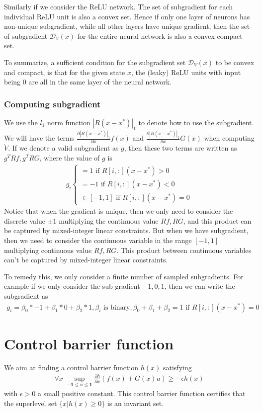 \documentclass{article}
\begin{document}
Similarly if we consider the ReLU network. The set of subgradient for each individual ReLU unit is also a convex set. Hence if only one layer of neurons has non-unique subgradient, while all other layers have unique gradient, then the set of subgradient $\mathcal{D}_V(x)$ for the entire neural network is also a convex compact set.

To summarize, a sufficient condition for the subgradient set $\mathcal{D}_V(x)$ to be convex and compact, is that for the given state $x$, the (leaky) ReLU units with input being 0 are all in the same layer of the neural network.

\subsubsection{Computing subgradient}
We use the $l_1$ norm function $|R(x-x^*)|_1$ to denote how to use the subgradient. We will have the terms $\frac{\partial |R(x-x^*)|_1}{\partial x}f(x)$ and $\frac{\partial |R(x-x^*)|_1}{\partial x}G(x)$ when computing $\dot{V}$. If we denote a valid subgradient as $g$, then these two terms are written as $g^TRf, g^TRG$, where the value of $g$ is
\begin{align}
	g_i  \begin{cases}
		=1 \text{ if } R[i, :](x-x^*) > 0\\
		=-1 \text{ if } R[i, :](x-x^*) < 0\\
		\in[-1, 1] \text{ if } R[i, :](x-x^*)=0
	\end{cases}
\end{align}
Notice that when the gradient is unique, then we only need to consider the discrete value $\pm1$ multiplying the continuous value $Rf, RG$, and this product can be captured by mixed-integer linear constraints. But when we have subgradient, then we need to consider the continuous variable in the range $[-1, 1]$ multiplying continuous value $Rf, RG$. This product between continuous variables can't be captured by mixed-integer linear constraints.

To remedy this, we only consider a finite number of sampled subgradients. For example if we only consider the sub-gradient $-1, 0, 1$, then we can write the subgradient as
\begin{align}
	g_i = \beta_0*-1+\beta_1 * 0 + \beta_2 * 1, \beta_i \text{ is binary}, \beta_0 + \beta_1 + \beta_2 = 1 \text{ if } R[i, :] (x-x^*)=0
\end{align}

\section{Control barrier function}
We aim at finding a control barrier function $h(x)$ satisfying
\begin{align}
	\forall x\;\sup_{-\mathbf{1}\le u\le\mathbf{1}} \frac{\partial h}{\partial x}(f(x) + G(x)u) \ge -\epsilon h(x)
\end{align}
with $\epsilon > 0$ a small positive constant. This control barrier function certifies that the superlevel set $\{x | h(x) \ge 0\}$ is an invariant set.
\end{document}
